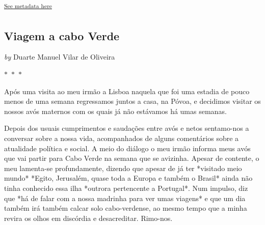 \documentclass{article}
\begin{document}
        \textsuperscript{\hyperref[table:\arabic{tablecounter}]{See metadata here}}
    


\newpage

\begin{center}
\section{Viagem a cabo Verde}
\vspace{0.5cm}

    
        \textit{by} Duarte Manuel Vilar de Oliveira
    

\vspace{0.75cm}
 
    
\vspace{0.75cm}
    $\ast$~$\ast$~$\ast$  


    \begin{center}
        \begin{minipage}{0.9\textwidth}
            \setlength{\parskip}{0.2cm}
            \setlength{\parindent}{0cm}
            \fontsize{12pt}{14pt}\selectfont
            


Após uma visita ao meu irmão a Lisboa naquela que foi uma estadia de
pouco menos de uma semana regressamos juntos a casa, na Póvoa, e
decidimos visitar os nossos avós maternos com os quais já não estávamos
há umas semanas.

Depois dos usuais cumprimentos e saudações entre avós e netos
sentamo-nos a conversar sobre a nossa vida, acompanhados de alguns
comentários sobre a atualidade política e social. A meio do diálogo o
meu irmão informa meus avós que vai partir para Cabo Verde na semana que
se avizinha. Apesar de contente, o meu lamenta-se profundamente, dizendo
que apesar de já ter *visitado meio mundo* *Egito, Jerusalém, quase toda
a Europa e também o Brasil* ainda não tinha conhecido essa ilha *outrora
pertencente a Portugal*. Num impulso, diz que *há de falar com a nossa
madrinha para ver umas viagens* e que um dia também irá também calcar
solo cabo-verdense, ao mesmo tempo que a minha revira os olhos em
discórdia e desacreditar. Rimo-nos.

        \end{minipage}
    \end{center}
\end{center}
    
\end{document}
